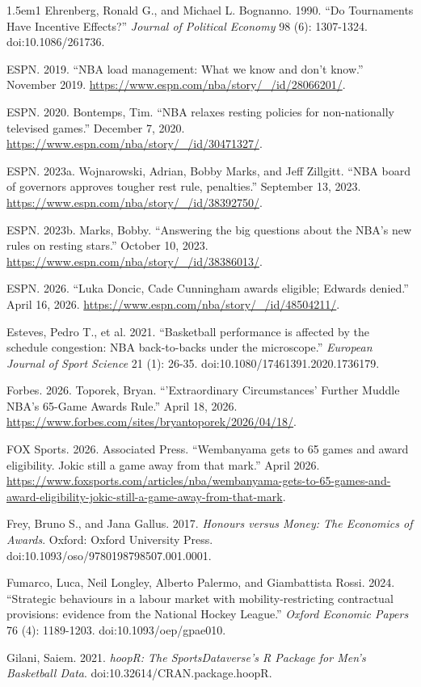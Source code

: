 \documentclass[11pt]{article}
\begin{document}
\begin{hangparas}{1.5em}{1}
Ehrenberg, Ronald G., and Michael L. Bognanno. 1990. ``Do Tournaments Have Incentive Effects?'' \emph{Journal of Political Economy} 98 (6): 1307-1324. doi:10.1086/261736.

ESPN. 2019. ``NBA load management: What we know and don't know.'' November 2019. \url{https://www.espn.com/nba/story/_/id/28066201/}.

ESPN. 2020. Bontemps, Tim. ``NBA relaxes resting policies for non-nationally televised games.'' December 7, 2020. \url{https://www.espn.com/nba/story/_/id/30471327/}.

ESPN. 2023a. Wojnarowski, Adrian, Bobby Marks, and Jeff Zillgitt. ``NBA board of governors approves tougher rest rule, penalties.'' September 13, 2023. \url{https://www.espn.com/nba/story/_/id/38392750/}.

ESPN. 2023b. Marks, Bobby. ``Answering the big questions about the NBA's new rules on resting stars.'' October 10, 2023. \url{https://www.espn.com/nba/story/_/id/38386013/}.

ESPN. 2026. ``Luka Doncic, Cade Cunningham awards eligible; Edwards denied.'' April 16, 2026. \url{https://www.espn.com/nba/story/_/id/48504211/}.

Esteves, Pedro T., et al. 2021. ``Basketball performance is affected by the schedule congestion: NBA back-to-backs under the microscope.'' \emph{European Journal of Sport Science} 21 (1): 26-35. doi:10.1080/17461391.2020.1736179.

Forbes. 2026. Toporek, Bryan. ``'Extraordinary Circumstances' Further Muddle NBA's 65-Game Awards Rule.'' April 18, 2026. \url{https://www.forbes.com/sites/bryantoporek/2026/04/18/}.

FOX Sports. 2026. Associated Press. ``Wembanyama gets to 65 games and award eligibility. Jokic still a game away from that mark.'' April 2026. \url{https://www.foxsports.com/articles/nba/wembanyama-gets-to-65-games-and-award-eligibility-jokic-still-a-game-away-from-that-mark}.

Frey, Bruno S., and Jana Gallus. 2017. \emph{Honours versus Money: The Economics of Awards}. Oxford: Oxford University Press. doi:10.1093/oso/9780198798507.001.0001.

Fumarco, Luca, Neil Longley, Alberto Palermo, and Giambattista Rossi. 2024. ``Strategic behaviours in a labour market with mobility-restricting contractual provisions: evidence from the National Hockey League.'' \emph{Oxford Economic Papers} 76 (4): 1189-1203. doi:10.1093/oep/gpae010.

Gilani, Saiem. 2021. \emph{hoopR: The SportsDataverse's R Package for Men's Basketball Data}. doi:10.32614/CRAN.package.hoopR.


\end{hangparas}
\end{document}
